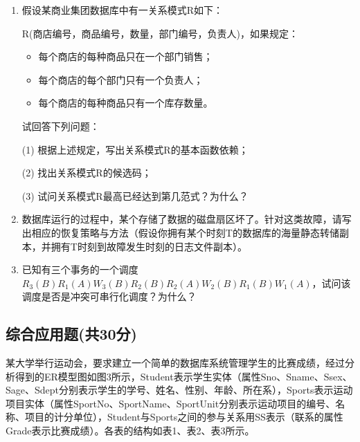 \documentclass{article}
\begin{document}
\begin{enumerate}
\item 假设某商业集团数据库中有一关系模式R如下：

R(商店编号，商品编号，数量，部门编号，负责人)，如果规定：

\begin{itemize}
\item 每个商店的每种商品只在一个部门销售；
\item 每个商店的每个部门只有一个负责人；
\item 每个商店的每种商品只有一个库存数量。
\end{itemize}

试回答下列问题：

(1) 根据上述规定，写出关系模式R的基本函数依赖；

(2) 找出关系模式R的候选码；

(3) 试问关系模式R最高已经达到第几范式？为什么？

\item 数据库运行的过程中，某个存储了数据的磁盘扇区坏了。针对这类故障，请写出相应的恢复策略与方法（假设你拥有某个时刻T的数据库的海量静态转储副本，并拥有T时刻到故障发生时刻的日志文件副本）。

\item 已知有三个事务的一个调度$R_3(B)R_1(A)W_3(B)R_2(B)R_2(A)W_2(B)R_1(B)W_1(A)$，试问该调度是否是冲突可串行化调度？为什么？
\end{enumerate}

\subsection{综合应用题(共30分)}

某大学举行运动会，要求建立一个简单的数据库系统管理学生的比赛成绩，经过分析得到的ER模型图如图3所示，Student表示学生实体（属性Sno、Sname、Ssex、Sage、Sdept分别表示学生的学号、姓名、性别、年龄、所在系），Sports表示运动项目实体（属性SportNo、SportName、SportUnit分别表示运动项目的编号、名称、项目的计分单位），Student与Sports之间的参与关系用SS表示（联系的属性Grade表示比赛成绩）。各表的结构如表1、表2、表3所示。
\end{document}
